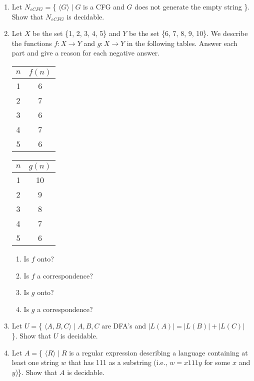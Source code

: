 \documentclass{article}
\begin{document}
\begin{enumerate}
        \item Let $N_{\varepsilon CFG} = $\{ $\langle G \rangle \mid G$ is a CFG and $G$ 
        does not generate the empty string \}. Show that $N_{\varepsilon CFG}$ is 
        decidable.

        \item Let $X$ be the set \{1, 2, 3, 4, 5\} and $Y$ be the set \{6, 7, 8, 9, 10\}. 
        We describe the functions $f : X\rightarrow Y$ and $g : X \rightarrow Y$ in the 
        following tables. Answer each part and give a reason for each negative answer.
        \begin{center}
            \begin{tabular}{c|c}
                $n$ & $f(n)$\\
                \hline
                1 & 6\\
                2 & 7\\
                3 & 6\\
                4 & 7\\
                5 & 6
            \end{tabular}
            \quad
            \begin{tabular}{c | c}
                $n$ & $g(n)$\\
                \hline
                1 & 10\\
                2 & 9\\
                3 & 8\\
                4 & 7\\
                5 & 6
            \end{tabular}
        \end{center}
        \begin{enumerate}
            \item Is $f$ onto?
            \item Is $f$ a correspondence?
            \item Is $g$ onto?
            \item Is $g$ a correspondence?
        \end{enumerate}

        \item Let $U = $\{ $\langle A, B, C \rangle \mid A, B, C$ are DFA's and $|L(A)| = 
        |L(B)| + |L(C)|$ \}. Show that $U$ is decidable.

        \item Let $A = $\{ $\langle R \rangle \mid R$ is a regular expression describing a 
        language containing at least one string $w$ that has 111 as a substring (i.e., 
        $w = x111y$ for some $x$ and $y$)\}. Show that $A$ is decidable.
        

\end{enumerate}
\end{document}
